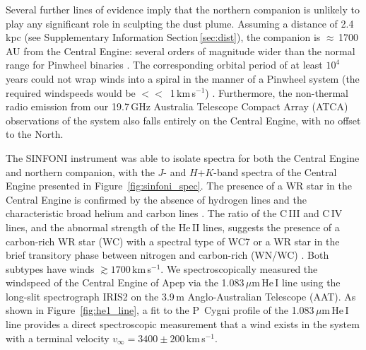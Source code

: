 \documentclass[preprint,times]{aastex61}
\begin{document}

Several further lines of evidence imply that the northern companion is unlikely to play any significant role in sculpting the dust plume. Assuming a distance of 2.4\,kpc (see Supplementary Information Section\,\ref{sec:dist}), the companion is $\approx$\,1700\,AU from the Central Engine: several orders of magnitude wider than the normal range for Pinwheel binaries \citep{tuthill2008}. The corresponding orbital period of at least $10^4$ years could not wrap winds into a spiral in the manner of a Pinwheel system (the required windspeeds would be $<<$~1\,km\,s$^{-1}$) \citep{1999ApJ...525L..97M,tuthill2008}. Furthermore, the non-thermal radio emission from our 19.7\,GHz Australia Telescope Compact Array (ATCA) observations of the system also falls entirely on the Central Engine, with no offset to the North.


The SINFONI instrument was able to isolate spectra for both the Central Engine and northern companion, with the $J$- and $H$+$K$-band spectra of the Central Engine presented in Figure~\ref{fig:sinfoni_spec}. The presence of a WR star in the Central Engine is confirmed by the absence of hydrogen lines and the characteristic broad helium and carbon lines \citep{1968MNRAS.138..109S}. The ratio of the C\,III and C\,IV lines, and the abnormal strength of the He\,II lines, suggests the presence of a carbon-rich WR star (WC) with a spectral type of WC7 or a WR star in the brief transitory phase between nitrogen and carbon-rich (WN/WC) \citep{Crowther2006,2018MNRAS.473.2853R}. Both subtypes have winds\citep{2007ARA&A..45..177C} $\gtrsim 1700$\,km\,s$^{-1}$. We spectroscopically measured the windspeed of the Central Engine of Apep via the 1.083\,$\mu$m\,He\,I line using the long-slit spectrograph IRIS2 on the 3.9\,m Anglo-Australian Telescope (AAT). As shown in Figure~\ref{fig:he1_line}, a fit to the P~Cygni profile of the 1.083\,$\mu$m\,He\,I line provides a direct spectroscopic measurement that a wind exists in the system with a terminal velocity $v_{\infty} =  3400 \pm 200$\,km\,s$^{-1}$.
\end{document}

